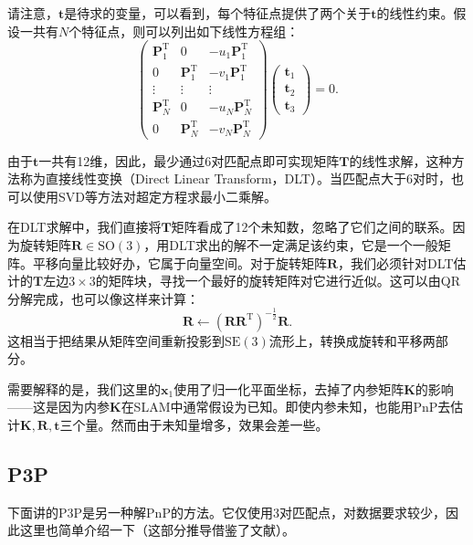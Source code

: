 请注意，$\bm{t}$是待求的变量，可以看到，每个特征点提供了两个关于$\bm{t}$的线性约束。假设一共有$N$个特征点，则可以列出如下线性方程组：
\begin{equation}
\begin{pmatrix}
\bm{P}_{1}^{\mathrm{T}} & 0 & -u_{1}\bm{P}_{1}^{\mathrm{T}}	\\
0 & \bm{P}_{1}^{\mathrm{T}} & -v_{1}\bm{P}_{1}^{\mathrm{T}}	\\
\vdots & \vdots & \vdots			\\
\bm{P}_{N}^{\mathrm{T}} & 0 & -u_{N}\bm{P}_{N}^{\mathrm{T}} \\
0 & \bm{P}_{N}^{\mathrm{T}} & -v_{N}\bm{P}_{N}^{\mathrm{T}}
\end{pmatrix}
\begin{pmatrix}
\bm{t}_{1} \\ \bm{t}_{2} \\ \bm{t}_{3}
\end{pmatrix}
=0.
\end{equation}

由于$\bm{t}$一共有12维，因此，最少通过6对匹配点即可实现矩阵$\bm{T}$的线性求解，这种方法称为直接线性变换（Direct Linear Transform，DLT）。当匹配点大于6对时，也可以使用SVD等方法对超定方程求最小二乘解。

在DLT求解中，我们直接将$\bm{T}$矩阵看成了12个未知数，忽略了它们之间的联系。因为旋转矩阵$\bm{R} \in \mathrm{SO}(3)$，用DLT求出的解不一定满足该约束，它是一个一般矩阵。平移向量比较好办，它属于向量空间。对于旋转矩阵$\bm{R}$，我们必须针对DLT估计的$\bm{T}$左边$3 \times 3$的矩阵块，寻找一个最好的旋转矩阵对它进行近似。这可以由QR分解完成\textsuperscript{\cite{Hartley2003, Chen1994}}，也可以像这样来计算\textsuperscript{\cite{Barfoot2016,Green1952}}：
\begin{equation}
\bm{R} \leftarrow {\left( {\bm{R}{\bm{R}^\mathrm{T}}} \right)^{ - \frac{1}{2}}} \bm{R}.
\end{equation}
这相当于把结果从矩阵空间重新投影到$\mathrm{SE}(3)$流形上，转换成旋转和平移两部分。

需要解释的是，我们这里的$\bm{x}_1$使用了归一化平面坐标，去掉了内参矩阵$\bm{K}$的影响——这是因为内参$\bm{K}$在SLAM中通常假设为已知。即使内参未知，也能用PnP去估计$\bm{K}, \bm{R}, \bm{t}$三个量。然而由于未知量增多，效果会差一些。

\subsection{P3P}
下面讲的P3P是另一种解PnP的方法。它仅使用3对匹配点，对数据要求较少，因此这里也简单介绍一下（这部分推导借鉴了文献\cite{web:p3p}）。

